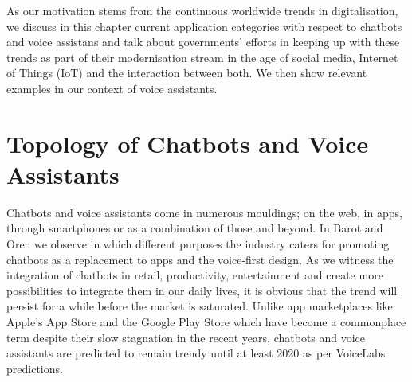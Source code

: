 


As our motivation stems from the %
continuous worldwide trends in digitalisation, we discuss in this chapter current application categories
with respect to chatbots and voice assistans
and talk about governments' efforts in keeping up with these trends as part of their 
modernisation stream
in the age of social media, Internet of Things (IoT) and the interaction between both.
We then show relevant examples in our context of voice assistants.




\section{Topology of Chatbots and Voice Assistants}

Chatbots and voice assistants come in numerous mouldings; on the web, in apps, through smartphones or as a combination of those and beyond. In Barot and Oren \cite{guidetochat} we observe in which different purposes the industry caters for promoting chatbots as a replacement to apps and the voice-first design. As we witness the integration of chatbots in retail, productivity, entertainment and create more possibilities to integrate them in our daily lives, it is obvious that the trend will %
persist for a while before the market is saturated. %
Unlike app marketplaces like Apple's App Store and the Google Play Store which have become a commonplace term despite their slow stagnation in the recent years, chatbots and voice assistants are predicted to remain trendy until at least 2020 as per VoiceLabs predictions. %

